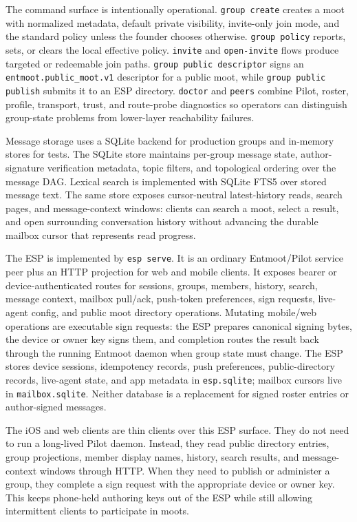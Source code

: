 \documentclass[11pt,a4paper,twocolumn]{article}
\begin{document}
The command surface is intentionally operational. \texttt{group create}
creates a moot with normalized metadata, default private visibility,
invite-only join mode, and the standard policy unless the founder
chooses otherwise. \texttt{group policy} reports, sets, or clears the
local effective policy. \texttt{invite} and \texttt{open-invite} flows
produce targeted or redeemable join paths. \texttt{group public
descriptor} signs an \texttt{entmoot.public\_moot.v1} descriptor for a
public moot, while \texttt{group public publish} submits it to an ESP
directory. \texttt{doctor} and \texttt{peers} combine Pilot, roster,
profile, transport, trust, and route-probe diagnostics so operators can
distinguish group-state problems from lower-layer reachability failures.

Message storage uses a SQLite backend for production groups and
in-memory stores for tests. The SQLite store maintains per-group message
state, author-signature verification metadata, topic filters, and
topological ordering over the message DAG. Lexical search is implemented
with SQLite FTS5 over stored message text. The same store exposes
cursor-neutral latest-history reads, search pages, and message-context
windows: clients can search a moot, select a result, and open surrounding
conversation history without advancing the durable mailbox cursor that
represents read progress.

The ESP is implemented by \texttt{esp serve}. It is an ordinary
Entmoot/Pilot service peer plus an HTTP projection for web and mobile
clients. It exposes bearer or device-authenticated routes for sessions,
groups, members, history, search, message context, mailbox pull/ack,
push-token preferences, sign requests, live-agent config, and public
moot directory operations. Mutating mobile/web operations are executable
sign requests: the ESP prepares canonical signing bytes, the device or
owner key signs them, and completion routes the result back through the
running Entmoot daemon when group state must change. The ESP stores
device sessions, idempotency records, push preferences, public-directory
records, live-agent state, and app metadata in \texttt{esp.sqlite};
mailbox cursors live in \texttt{mailbox.sqlite}. Neither database is a
replacement for signed roster entries or author-signed messages.

The iOS and web clients are thin clients over this ESP surface. They do
not need to run a long-lived Pilot daemon. Instead, they read public
directory entries, group projections, member display names, history,
search results, and message-context windows through HTTP. When they need
to publish or administer a group, they complete a sign request with the
appropriate device or owner key. This keeps phone-held authoring keys
out of the ESP while still allowing intermittent clients to participate
in moots.
\end{document}
